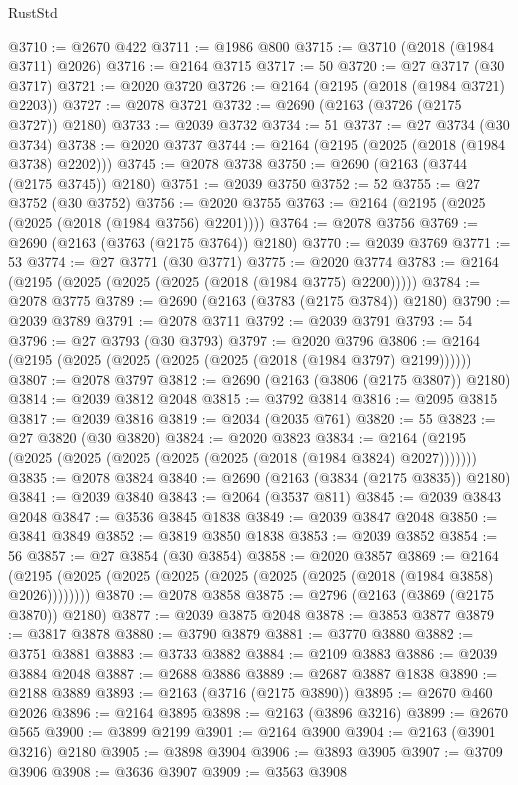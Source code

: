 \begin{lexlean}{RustStd}
\begin{coremodule}
@3710 := @2670 @422
@3711 := @1986 @800
@3715 := @3710 (@2018 (@1984 @3711) @2026)
@3716 := @2164 @3715
@3717 := 50
@3720 := @27 @3717 (@30 @3717)
@3721 := @2020 @3720
@3726 := @2164 (@2195 (@2018 (@1984 @3721) @2203))
@3727 := @2078 @3721
@3732 := @2690 (@2163 (@3726 (@2175 @3727)) @2180)
@3733 := @2039 @3732
@3734 := 51
@3737 := @27 @3734 (@30 @3734)
@3738 := @2020 @3737
@3744 := @2164 (@2195 (@2025 (@2018 (@1984 @3738) @2202)))
@3745 := @2078 @3738
@3750 := @2690 (@2163 (@3744 (@2175 @3745)) @2180)
@3751 := @2039 @3750
@3752 := 52
@3755 := @27 @3752 (@30 @3752)
@3756 := @2020 @3755
@3763 := @2164 (@2195 (@2025 (@2025 (@2018 (@1984 @3756) @2201))))
@3764 := @2078 @3756
@3769 := @2690 (@2163 (@3763 (@2175 @3764)) @2180)
@3770 := @2039 @3769
@3771 := 53
@3774 := @27 @3771 (@30 @3771)
@3775 := @2020 @3774
@3783 := @2164 (@2195 (@2025 (@2025 (@2025 (@2018 (@1984 @3775) @2200)))))
@3784 := @2078 @3775
@3789 := @2690 (@2163 (@3783 (@2175 @3784)) @2180)
@3790 := @2039 @3789
@3791 := @2078 @3711
@3792 := @2039 @3791
@3793 := 54
@3796 := @27 @3793 (@30 @3793)
@3797 := @2020 @3796
@3806 := @2164 (@2195 (@2025 (@2025 (@2025 (@2025 (@2018 (@1984 @3797) @2199))))))
@3807 := @2078 @3797
@3812 := @2690 (@2163 (@3806 (@2175 @3807)) @2180)
@3814 := @2039 @3812 @2048
@3815 := @3792 @3814
@3816 := @2095 @3815
@3817 := @2039 @3816
@3819 := @2034 (@2035 @761)
@3820 := 55
@3823 := @27 @3820 (@30 @3820)
@3824 := @2020 @3823
@3834 := @2164 (@2195 (@2025 (@2025 (@2025 (@2025 (@2025 (@2018 (@1984 @3824) @2027)))))))
@3835 := @2078 @3824
@3840 := @2690 (@2163 (@3834 (@2175 @3835)) @2180)
@3841 := @2039 @3840
@3843 := @2064 (@3537 @811)
@3845 := @2039 @3843 @2048
@3847 := @3536 @3845 @1838
@3849 := @2039 @3847 @2048
@3850 := @3841 @3849
@3852 := @3819 @3850 @1838
@3853 := @2039 @3852
@3854 := 56
@3857 := @27 @3854 (@30 @3854)
@3858 := @2020 @3857
@3869 := @2164 (@2195 (@2025 (@2025 (@2025 (@2025 (@2025 (@2025 (@2018 (@1984 @3858) @2026))))))))
@3870 := @2078 @3858
@3875 := @2796 (@2163 (@3869 (@2175 @3870)) @2180)
@3877 := @2039 @3875 @2048
@3878 := @3853 @3877
@3879 := @3817 @3878
@3880 := @3790 @3879
@3881 := @3770 @3880
@3882 := @3751 @3881
@3883 := @3733 @3882
@3884 := @2109 @3883
@3886 := @2039 @3884 @2048
@3887 := @2688 @3886
@3889 := @2687 @3887 @1838
@3890 := @2188 @3889
@3893 := @2163 (@3716 (@2175 @3890))
@3895 := @2670 @460 @2026
@3896 := @2164 @3895
@3898 := @2163 (@3896 @3216)
@3899 := @2670 @565
@3900 := @3899 @2199
@3901 := @2164 @3900
@3904 := @2163 (@3901 @3216) @2180
@3905 := @3898 @3904
@3906 := @3893 @3905
@3907 := @3709 @3906
@3908 := @3636 @3907
@3909 := @3563 @3908

\end{coremodule}
\end{lexlean}
